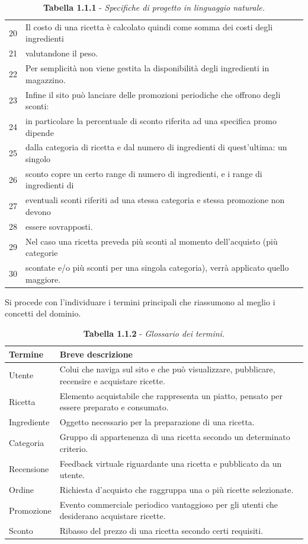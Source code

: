 \begin{table}[H]
\begin{tabularx}{\textwidth}{|c|X|}
20 & Il costo di una ricetta è calcolato quindi come somma dei costi degli ingredienti \\
21 & valutandone il peso. \\
22 & Per semplicità non viene gestita la disponibilità degli ingredienti in magazzino. \\
23 & Infine il sito può lanciare delle promozioni periodiche che offrono degli sconti: \\
24 & in particolare la percentuale di sconto riferita ad una specifica promo dipende \\
25 & dalla categoria di ricetta e dal numero di ingredienti di quest'ultima: un singolo \\
26 & sconto copre un certo range di numero di ingredienti, e i range di ingredienti di \\
27 & eventuali sconti riferiti ad una stessa categoria e stessa promozione non devono \\
28 & essere sovrapposti. \\
29 & Nel caso una ricetta preveda più sconti al momento dell'acquisto (più categorie \\
30 & scontate e/o più sconti per una singola categoria), verrà applicato quello maggiore. \\
\hline
\end{tabularx}
\caption*{\textbf{Tabella 1.1.1} - \textit{Specifiche di progetto in linguaggio naturale.}}
\end{table}

Si procede con l'individuare i termini principali che riassumono al meglio i concetti del dominio.

\begin{table}[H]
\centering
\renewcommand{\arraystretch}{1.3} %
\setlength{\tabcolsep}{8pt}

\begin{tabularx}{\textwidth}{|l|X|}
\hline
\textbf{Termine} & \textbf{Breve descrizione} \\
\hline
Utente & Colui che naviga sul sito e che può visualizzare, pubblicare, recensire e acquistare ricette. \\
Ricetta & Elemento acquistabile che rappresenta un piatto, pensato per essere preparato e consumato. \\
Ingrediente & Oggetto necessario per la preparazione di una ricetta. \\
Categoria & Gruppo di appartenenza di una ricetta secondo un determinato criterio. \\
Recensione & Feedback virtuale riguardante una ricetta e pubblicato da un utente. \\
Ordine & Richiesta d’acquisto che raggruppa una o più ricette selezionate. \\
Promozione & Evento commerciale periodico vantaggioso per gli utenti che desiderano acquistare ricette. \\
Sconto & Ribasso del prezzo di una ricetta secondo certi requisiti. \\
\hline
\end{tabularx}
\caption*{\textbf{Tabella 1.1.2} - \textit{Glossario dei termini.}}
\end{table}


